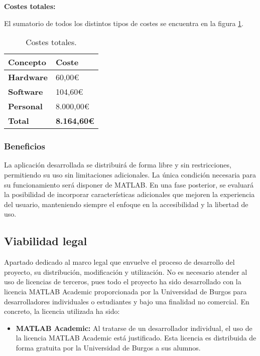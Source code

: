 \textbf{Costes totales:}

El sumatorio de todos los distintos tipos de costes se encuentra en la figura \ref{tabla:costes-de-totales}.

\begin{table}[h!]
    \centering
    \begin{tabular}{l l}
        \hline
        \textbf{Concepto}   & \textbf{Coste}        \\
        \hline
        \textbf{Hardware}   & 60,00€                \\
        \textbf{Software}   & 104,60€               \\
        \textbf{Personal}   & 8.000,00€             \\
        \hline
        \textbf{Total}      & \textbf{8.164,60€}    \\
        \hline
    \end{tabular}
    \caption{Costes totales.}\label{tabla:costes-de-totales}
\end{table}

\subsubsection{Beneficios}\label{beneficios}

La aplicación desarrollada se distribuirá de forma libre y sin restricciones, permitiendo su uso sin limitaciones adicionales. La única condición necesaria para su funcionamiento será disponer de MATLAB. En una fase posterior, se evaluará la posibilidad de incorporar características adicionales que mejoren la experiencia del usuario, manteniendo siempre el enfoque en la accesibilidad y la libertad de uso.

\subsection{Viabilidad legal}\label{viabilidad-legal}

Apartado dedicado al marco legal que envuelve el proceso de desarrollo del proyecto, su distribución, modificación y utilización. No es necesario atender al uso de licencias de terceros, pues todo el proyecto ha sido desarrollado con la licencia MATLAB Academic proporcionada por la Universidad de Burgos para desarrolladores individuales o estudiantes y bajo una finalidad no comercial. En concreto, la licencia utilizada ha sido:

\begin{itemize}
  \item \textbf{MATLAB Academic:} Al tratarse de un desarrollador individual, el uso de la licencia MATLAB Academic está justificado. Esta licencia es distribuida de forma gratuita por la Universidad de Burgos a sus alumnos.
\end{itemize}

